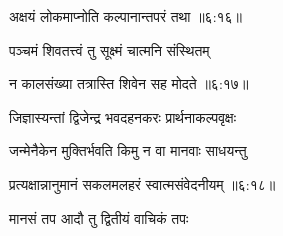 
{\devanagarifont अक्षयं लोकमाप्नोति कल्पानान्तपरं तथा {॥६:१६॥} \veg\dontdisplaylinenum  }%

{\devanagarifont पञ्चमं शिवतत्त्वं तु सूक्ष्मं चात्मनि संस्थितम् \thinspace{\dandab} \dontdisplaylinenum }%
 

{\devanagarifont न कालसंख्या तत्रास्ति शिवेन सह मोदते {॥६:१७॥} \veg\dontdisplaylinenum }%
 
\ujvers{}    %

\nemslokab

{\devanagarifont जिज्ञास्यन्तां द्विजेन्द्र भवदहनकरः प्रार्थनाकल्पवृक्षः  \danda\dontdisplaylinenum }%

\nemslokac

{\devanagarifont जन्मेनैकेन मुक्तिर्भवति किमु न वा मानवाः साधयन्तु }%
  \dontdisplaylinenum    {}%


\nemslokad

{\devanagarifont प्रत्यक्षान्नानुमानं सकलमलहरं स्वात्मसंवेदनीयम् {॥६:१८॥} \veg\dontdisplaylinenum }%

\vers



 
{\devanagarifont मानसं तप आदौ तु द्वितीयं वाचिकं तपः \thinspace{\dandab} \dontdisplaylinenum }%


